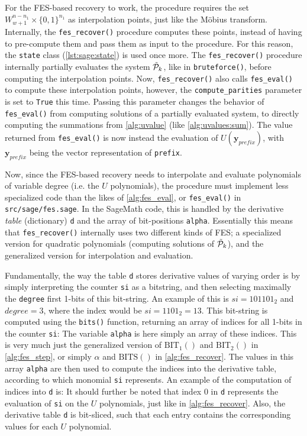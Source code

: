 For the FES-based recovery to work, the procedure requires the set $W^{n - n_1}_{w + 1} \times \{0,1\}^{n_1}$ as interpolation points, just like the Möbius transform. Internally, the \texttt{fes\_recover()} procedure computes these points, instead of having to pre-compute them and pass them as input to the procedure. For this reason, the \texttt{state} class (\cref{lst:sage:state}) is used once more. The \texttt{fes\_recover()} procedure internally partially evaluates the system $\Tilde{\mathcal{P}}_k$, like in \texttt{bruteforce()}, before computing the interpolation points. Now, \texttt{fes\_recover()} also calls \texttt{fes\_eval()} to compute these interpolation points, however, the \texttt{compute\_parities} parameter is set to \texttt{True} this time. Passing this parameter changes the behavior of \texttt{fes\_eval()} from computing solutions of a partially evaluated system, to directly computing the summations from \cref{alg:uvalue} (like \cref{alg:uvalues:sum}). The value returned from \texttt{fes\_eval()} is now instead the evaluation of $U(\mathbf{y}_{prefix})$, with $\mathbf{y}_{prefix}$ being the vector representation of \texttt{prefix}.

Now, since the FES-based recovery needs to interpolate and evaluate polynomials of variable degree (i.e. the $U$ polynomials), the procedure must implement less specialized code than the likes of \cref{alg:fes_eval}, or \texttt{fes\_eval()} in \texttt{src/sage/fes.sage}. In the SageMath code, this is handled by the derivative \textit{table} (dictionary) \texttt{d} and the array of bit-positions \texttt{alpha}. Essentially this means that \texttt{fes\_recover()} internally uses two different kinds of FES; a specialized version for quadratic polynomials (computing solutions of $\Tilde{\mathcal{P}}_k$), and the generalized version for interpolation and evaluation.

Fundamentally, the way the table \texttt{d} stores derivative values of varying order is by simply interpreting the counter \texttt{si} as a bitstring, and then selecting maximally the \texttt{degree} first 1-bits of this bit-string. An example of this is $si = 101101_2$ and $degree = 3$, where the index would be $si = 1101_2 = 13$. This bit-string is computed using the \texttt{bits()} function, returning an array of indices for all 1-bits in the counter \texttt{si}:
The variable \texttt{alpha} is here simply an array of these indices. This is very much just the generalized version of $\text{BIT}_1()$ and $\text{BIT}_2()$ in \cref{alg:fes_step}, or simply $\alpha$ and $\text{BITS}()$ in \cref{alg:fes_recover}. The values in this array \texttt{alpha} are then used to compute the indices into the derivative table, according to which monomial \texttt{si} represents. An example of the computation of indices into \texttt{d} is:
It should further be noted that index $0$ in \texttt{d} represents the evaluation of \texttt{si} on the $U$ polynomials, just like in \cref{alg:fes_recover}. Also, the derivative table \texttt{d} is bit-sliced, such that each entry contains the corresponding values for each $U$ polynomial.

